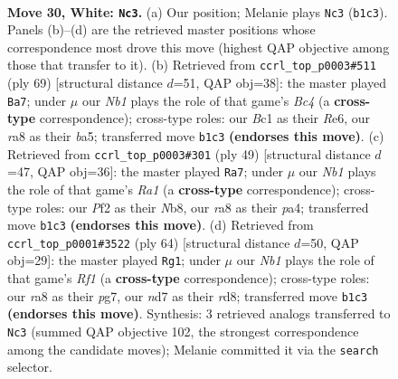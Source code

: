 \documentclass[11pt]{article}
\begin{document}
\clearpage

\begin{figure}[p]\centering
\begin{subfigure}{0.46\textwidth}\centering
\resizebox{\linewidth}{!}{%
\newchessgame
\chessboard[
  setfen={r7/3n1k2/5b2/8/p1p1p2p/P7/1PP2PPP/RNBK4 w - - 2 30},
  showmover=false,
  pgfstyle=straightmove, color=movearrow, markmove={b1-c3}
]}
\caption{}
\end{subfigure}\hfill
\begin{subfigure}{0.46\textwidth}\centering
\resizebox{\linewidth}{!}{%
\newchessgame
\chessboard[
  setfen={8/5k2/2p1r1p1/B1b1ppPp/P6P/5P2/1PK1R3/8 b - - 2 35},
  showmover=false,
  pgfstyle=straightmove, color=movearrow, markmove={c5-a7}
]}
\caption{}
\end{subfigure}
\\[4pt]
\begin{subfigure}{0.46\textwidth}\centering
\resizebox{\linewidth}{!}{%
\newchessgame
\chessboard[
  setfen={rnb1k3/1p3p2/2p4p/p1P5/P2B3P/2P5/8/1R3BK1 b - - 0 25},
  showmover=false,
  pgfstyle=straightmove, color=movearrow, markmove={a8-a7}
]}
\caption{}
\end{subfigure}\hfill
\begin{subfigure}{0.46\textwidth}\centering
\resizebox{\linewidth}{!}{%
\newchessgame
\chessboard[
  setfen={1b1r4/6p1/p1k4p/1p3p1P/5P2/PP6/2P5/1KB2R2 w - - 0 33},
  showmover=false,
  pgfstyle=straightmove, color=movearrow, markmove={f1-g1}
]}
\caption{}
\end{subfigure}
\caption{\textbf{Move 30, White: \texttt{Nc3}.} (a) Our position; Melanie plays \texttt{Nc3} (\texttt{b1c3}). Panels (b)--(d) are the retrieved master positions whose correspondence most drove this move (highest QAP objective among those that transfer to it). (b) Retrieved from \texttt{ccrl\_top\_p0003\#511} (ply 69) [structural distance $d$=51, QAP obj=38]: the master played \texttt{Ba7}; under $\mu$ our \emph{Nb1} plays the role of that game's \emph{Bc4} (a \textbf{cross-type} correspondence); cross-type roles: our \emph{B}c1 as their \emph{R}e6, our \emph{r}a8 as their \emph{b}a5; transferred move \texttt{b1c3} \textbf{(endorses this move)}. (c) Retrieved from \texttt{ccrl\_top\_p0003\#301} (ply 49) [structural distance $d$=47, QAP obj=36]: the master played \texttt{Ra7}; under $\mu$ our \emph{Nb1} plays the role of that game's \emph{Ra1} (a \textbf{cross-type} correspondence); cross-type roles: our \emph{P}f2 as their \emph{N}b8, our \emph{r}a8 as their \emph{p}a4; transferred move \texttt{b1c3} \textbf{(endorses this move)}. (d) Retrieved from \texttt{ccrl\_top\_p0001\#3522} (ply 64) [structural distance $d$=50, QAP obj=29]: the master played \texttt{Rg1}; under $\mu$ our \emph{Nb1} plays the role of that game's \emph{Rf1} (a \textbf{cross-type} correspondence); cross-type roles: our \emph{r}a8 as their \emph{p}g7, our \emph{n}d7 as their \emph{r}d8; transferred move \texttt{b1c3} \textbf{(endorses this move)}. Synthesis: 3 retrieved analogs transferred to \texttt{Nc3} (summed QAP objective 102, the strongest correspondence among the candidate moves); Melanie committed it via the \texttt{search} selector.}
\label{fig:thought-m58}
\end{figure}
\end{document}
